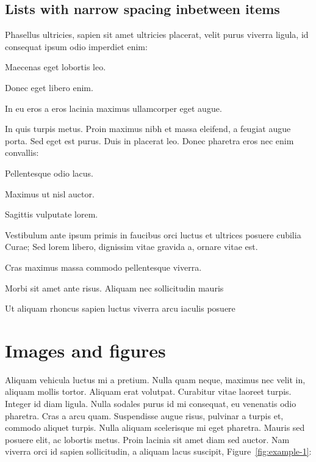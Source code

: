 		\subsection{Lists with narrow spacing inbetween items}

		Phasellus ultricies, sapien sit amet ultricies placerat, velit purus viverra ligula, id consequat ipsum odio imperdiet enim:
		\begin{compactenum}
			\item Maecenas eget lobortis leo.
			\item Donec eget libero enim.
			\item In eu eros a eros lacinia maximus ullamcorper eget augue.
		\end{compactenum}

		\bigskip

		In quis turpis metus. Proin maximus nibh et massa eleifend, a feugiat augue porta. Sed eget est purus. Duis in placerat leo. Donec pharetra eros nec enim convallis:
		\begin{compactitem}
			\item Pellentesque odio lacus.
			\item Maximus ut nisl auctor.
			\item Sagittis vulputate lorem.
		\end{compactitem}

		\bigskip

		Vestibulum ante ipsum primis in faucibus orci luctus et ultrices posuere cubilia Curae; Sed lorem libero, dignissim vitae gravida a, ornare vitae est.
		\begin{compactdesc}
			\item[Cras maximus] massa commodo pellentesque viverra.
			\item[Morbi sit] amet ante risus. Aliquam nec sollicitudin mauris
			\item[Ut aliquam rhoncus sapien] luctus viverra arcu iaculis posuere
		\end{compactdesc}


		\section{Images and figures}

		Aliquam vehicula luctus mi a pretium. Nulla quam neque, maximus nec velit in, aliquam mollis tortor. Aliquam erat volutpat. Curabitur vitae laoreet turpis. Integer id diam ligula. Nulla sodales purus id mi consequat, eu venenatis odio pharetra. Cras a arcu quam. Suspendisse augue risus, pulvinar a turpis et, commodo aliquet turpis. Nulla aliquam scelerisque mi eget pharetra. Mauris sed posuere elit, ac lobortis metus. Proin lacinia sit amet diam sed auctor. Nam viverra orci id sapien sollicitudin, a aliquam lacus suscipit, Figure~\ref{fig:example-1}:

